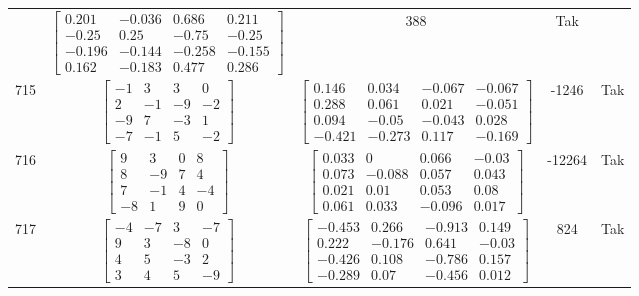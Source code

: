 \documentclass[a4paper,12pt]{article}
\begin{document}
\begin{tabular}{c c c c c}
&
$\begin{bmatrix} 0.201 & -0.036 & 0.686 & 0.211 \\ -0.25 & 0.25 & -0.75 & -0.25 \\ -0.196 & -0.144 & -0.258 & -0.155 \\ 0.162 & -0.183 & 0.477 & 0.286 \end{bmatrix}$
&
388
&
Tak
\\
715
&
$\begin{bmatrix} -1 & 3 & 3 & 0 \\ 2 & -1 & -9 & -2 \\ -9 & 7 & -3 & 1 \\ -7 & -1 & 5 & -2 \end{bmatrix}$
&
$\begin{bmatrix} 0.146 & 0.034 & -0.067 & -0.067 \\ 0.288 & 0.061 & 0.021 & -0.051 \\ 0.094 & -0.05 & -0.043 & 0.028 \\ -0.421 & -0.273 & 0.117 & -0.169 \end{bmatrix}$
&
-1246
&
Tak
\\
716
&
$\begin{bmatrix} 9 & 3 & 0 & 8 \\ 8 & -9 & 7 & 4 \\ 7 & -1 & 4 & -4 \\ -8 & 1 & 9 & 0 \end{bmatrix}$
&
$\begin{bmatrix} 0.033 & 0 & 0.066 & -0.03 \\ 0.073 & -0.088 & 0.057 & 0.043 \\ 0.021 & 0.01 & 0.053 & 0.08 \\ 0.061 & 0.033 & -0.096 & 0.017 \end{bmatrix}$
&
-12264
&
Tak
\\
717
&
$\begin{bmatrix} -4 & -7 & 3 & -7 \\ 9 & 3 & -8 & 0 \\ 4 & 5 & -3 & 2 \\ 3 & 4 & 5 & -9 \end{bmatrix}$
&
$\begin{bmatrix} -0.453 & 0.266 & -0.913 & 0.149 \\ 0.222 & -0.176 & 0.641 & -0.03 \\ -0.426 & 0.108 & -0.786 & 0.157 \\ -0.289 & 0.07 & -0.456 & 0.012 \end{bmatrix}$
&
824
&
Tak
\\

\end{tabular}
\end{document}
